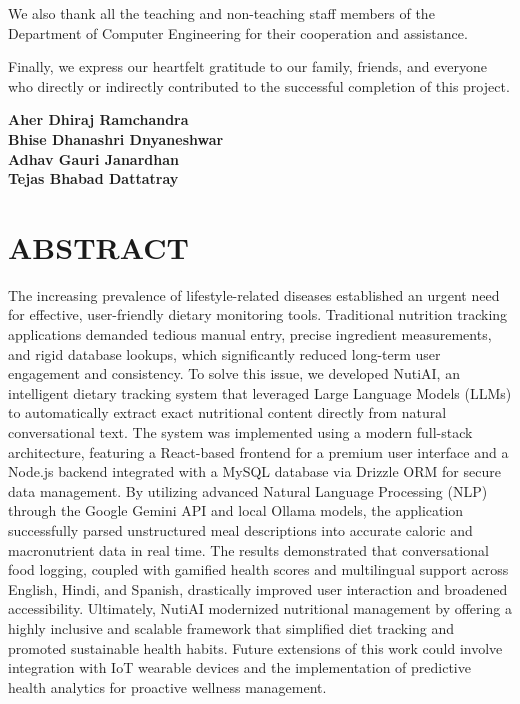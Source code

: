 \documentclass[12pt,a4paper]{report}
\newcommand{\StudentOne}{Aher Dhiraj Ramchandra}
\newcommand{\StudentTwo}{Bhise Dhanashri Dnyaneshwar}
\newcommand{\StudentThree}{Adhav Gauri Janardhan}
\newcommand{\StudentFour}{Tejas Bhabad Dattatray}
\begin{document}
We also thank all the teaching and non-teaching staff members of the Department of Computer Engineering for their cooperation and assistance.

Finally, we express our heartfelt gratitude to our family, friends, and everyone who directly or indirectly contributed to the successful completion of this project.

\vspace{15mm}

\begin{flushright}
\textbf{\StudentOne}\\
\textbf{\StudentTwo}\\
\textbf{\StudentThree}\\
\textbf{\StudentFour}
\end{flushright}

\newpage
\section*{\centering ABSTRACT}
\vspace{8mm}
\justifying

The increasing prevalence of lifestyle-related diseases established an urgent need for effective, user-friendly dietary monitoring tools. Traditional nutrition tracking applications demanded tedious manual entry, precise ingredient measurements, and rigid database lookups, which significantly reduced long-term user engagement and consistency. To solve this issue, we developed NutiAI, an intelligent dietary tracking system that leveraged Large Language Models (LLMs) to automatically extract exact nutritional content directly from natural conversational text. The system was implemented using a modern full-stack architecture, featuring a React-based frontend for a premium user interface and a Node.js backend integrated with a MySQL database via Drizzle ORM for secure data management. By utilizing advanced Natural Language Processing (NLP) through the Google Gemini API and local Ollama models, the application successfully parsed unstructured meal descriptions into accurate caloric and macronutrient data in real time. The results demonstrated that conversational food logging, coupled with gamified health scores and multilingual support across English, Hindi, and Spanish, drastically improved user interaction and broadened accessibility. Ultimately, NutiAI modernized nutritional management by offering a highly inclusive and scalable framework that simplified diet tracking and promoted sustainable health habits. Future extensions of this work could involve integration with IoT wearable devices and the implementation of predictive health analytics for proactive wellness management.
\end{document}
